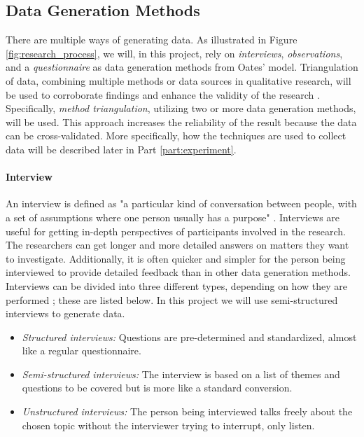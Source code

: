 \subsection{Data Generation Methods}
There are multiple ways of generating data. As illustrated in Figure \ref{fig:research_process}, we will, in this project, rely on \textit{interviews}, \textit{observations}, and a \textit{questionnaire} as data generation methods from Oates’ model. Triangulation of data, combining multiple methods or data sources in qualitative research, will be used to corroborate findings and enhance the validity of the research \citep{oates_researching_2006}. Specifically, \textit{method triangulation}, utilizing two or more data generation methods, will be used. This approach increases the reliability of the result because the data can be cross-validated. More specifically, how the techniques are used to collect data will be described later in Part \ref{part:experiment}.

\paragraph*{Interview}
An interview is defined as "a particular kind of conversation between people, with a set of assumptions where one person usually has a purpose" \citep{oates_researching_2006}. Interviews are useful for getting in-depth perspectives of participants involved in the research. The researchers can get longer and more detailed answers on matters they want to investigate. Additionally, it is often quicker and simpler for the person being interviewed to provide detailed feedback than in other data generation methods. Interviews can be divided into three different types, depending on how they are performed \citep{oates_researching_2006}; these are listed below. In this project we will use semi-structured interviews to generate data.
\begin{itemize}
    \item \textit{Structured interviews:} Questions are pre-determined and standardized, almost like a regular questionnaire.
    \item \textit{Semi-structured interviews:} The interview is based on a list of themes and questions to be covered but is more like a standard conversion. 
    \item \textit{Unstructured interviews:} The person being interviewed talks freely about the chosen topic without the interviewer trying to interrupt, only listen.
\end{itemize}

